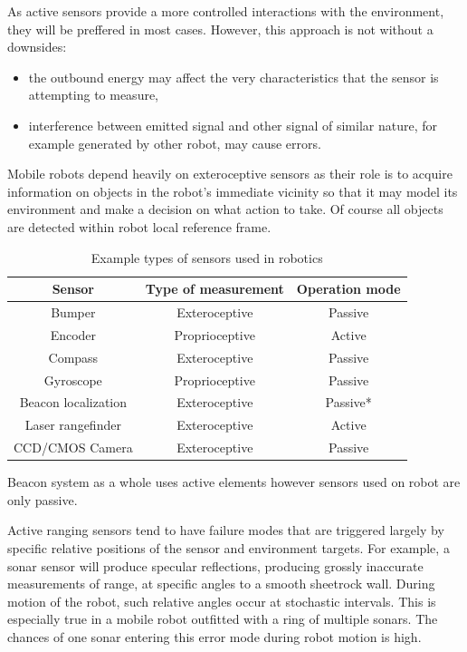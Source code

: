 As active sensors provide a  more controlled interactions with the environment, they  will be
preffered in most cases. However, this approach is not without a downsides:
\begin{itemize}
	\item the outbound energy may affect the very characteristics that the sensor is attempting
		to measure, 
	\item interference between emitted signal and other signal of similar nature, for 
		example generated by other robot, may cause errors.
\end{itemize}
Mobile robots depend heavily on exteroceptive sensors as their role is to acquire information on
objects in the robot’s immediate vicinity so that it may model its environment and make a 
decision on what action to take. Of course all objects are detected within robot local reference 
frame. 
\begin{table}[htb] 
	\centering
	\caption{Example types of sensors used in robotics}
	\label{tab:robot-sensors}
	\begin{tabular}{ccc}
		\hline
		\hline
		Sensor& Type of measurement& Operation mode\\
		\hline
		Bumper&  Exteroceptive& Passive\\
		Encoder& Proprioceptive& Active\\
		Compass& Exteroceptive& Passive\\
		Gyroscope& Proprioceptive& Passive\\
		Beacon localization& Exteroceptive& Passive*\\
		Laser rangefinder& Exteroceptive& Active\\
		CCD/CMOS Camera& Exteroceptive& Passive\\
		\hline
		\hline
	\end{tabular}
	\newline
	{\footnotesize *Beacon system as a whole uses active elements however sensors 
	used on robot are only passive.}
\end{table}
Active ranging sensors tend to have failure modes that are triggered largely by specific 
relative positions of the sensor and environment targets. For example, a sonar sensor will
produce specular reflections, producing grossly inaccurate measurements of range,
at specific angles to a smooth sheetrock wall. During motion of the robot, 
such relative angles occur at stochastic intervals. This is especially true
in a mobile robot outfitted with a ring of multiple sonars. The chances of one sonar entering
this error mode during robot motion is high.

